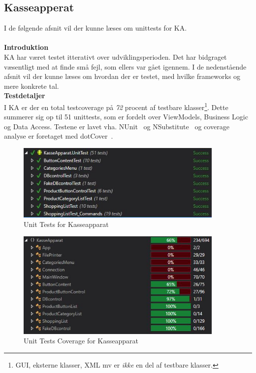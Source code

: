 \subsection{Kasseapperat}
I de følgende afsnit vil der kunne læses om unittests for \gls{KA}.\\\\

\textbf{Introduktion}\\
\gls{KA} har været testet itterativt over udviklingsperioden. Det har bidgraget væsentligt med at finde små fejl, som ellers var gået igennem. I de nedenstående afsnit vil der kunne læses om hvordan der er testet, med hvilke frameworks og mere konkrete tal.\\

\textbf{Testdetaljer}\\
I \gls{KA} er der en total testcoverage på \textit{72} procent af testbare klasser\footnote{GUI, eksterne klasser, XML mv er \textit{ikke} en del af testbare klasser.}. Dette summerer sig op til 51 unittests, som er fordelt over ViewModels, Business Logic og Data Access. Testene er lavet
vha. NUnit~\cite{NUnit} og NSubstitute~\cite{NSubstitute} og coverage analyse er foretaget med dotCover~\cite{dotCover}.

\begin{figure}[H]
	\centering
	\includegraphics[width=0.90\textwidth]{Test/Images/Frontend/UnitTests}
	\caption{Unit Tests for Kasseapparat}
	\label{fig:UTKA}
\end{figure}

\begin{figure}[H]
	\centering
	\includegraphics[width=0.90\textwidth]{Test/Images/Frontend/UnitTestCover}
	\caption{Unit Tests Coverage for Kasseapparat}
	\label{fig:UTCKA}
\end{figure}

